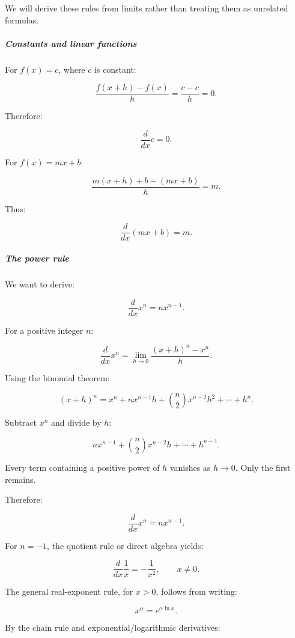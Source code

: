 \hypertarget{01-foundations-i-ch020-deriving-the-elementary-differentiation-rules}{}

We will derive these rules from limits rather than treating them as unrelated formulas.

\subparagraph{Constants and linear functions}\label{01-foundations-i-ch020-constants-and-linear-functions}

\hypertarget{01-foundations-i-ch020-constants-and-linear-functions}{}

For \(f(x)=c\), where \(c\) is constant:

\[
\frac{f(x+h)-f(x)}h=\frac{c-c}h=0.
\]

Therefore:

\[
\frac d{dx}c=0.
\]

For \(f(x)=mx+b\):

\[
\frac{m(x+h)+b-(mx+b)}h=m.
\]

Thus:

\[
\frac d{dx}(mx+b)=m.
\]

\subparagraph{The power rule}\label{01-foundations-i-ch020-the-power-rule}

\hypertarget{01-foundations-i-ch020-the-power-rule}{}

We want to derive:

\[
\boxed{\frac d{dx}x^n=nx^{n-1}}.
\]

For a positive integer \(n\):

\[
\frac d{dx}x^n = \lim_{h\to0}\frac{(x+h)^n-x^n}{h}.
\]

Using the binomial theorem:

\[
(x+h)^n= x^n+nx^{n-1}h+ \binom n2x^{n-2}h^2+\cdots+h^n.
\]

Subtract \(x^n\) and divide by \(h\):

\[
nx^{n-1}+ \binom n2x^{n-2}h+\cdots+h^{n-1}.
\]

Every term containing a positive power of \(h\) vanishes as \(h\to0\). Only the first remains.

Therefore:

\[
\frac d{dx}x^n=nx^{n-1}.
\]

For \(n=-1\), the quotient rule or direct algebra yields:

\[
\frac d{dx}\frac1x=-\frac1{x^2},\qquad x\ne0.
\]

The general real-exponent rule, for \(x>0\), follows from writing:

\[
x^\alpha=e^{\alpha\ln x}.
\]

By the chain rule and exponential/logarithmic derivatives:

